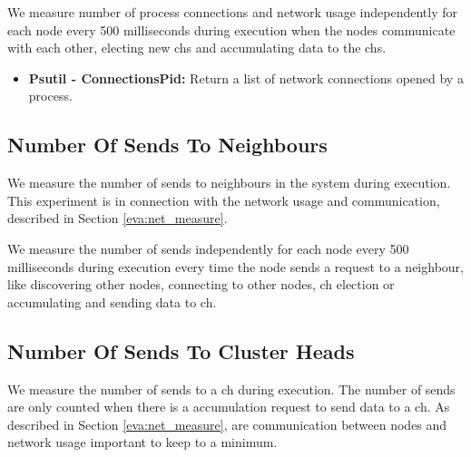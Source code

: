 \documentclass[USenglish]{uit-thesis}
\begin{document}

We measure number of process connections and network usage independently for each node every 500 milliseconds during execution when the nodes communicate with each other, electing new \glspl{ch} and accumulating data to the \glspl{ch}.

\begin{itemize}
\item \textbf{Psutil - ConnectionsPid:} Return a list of network connections opened by a process.
\end{itemize}



\subsection{Number Of Sends To Neighbours} \label{eva:num_sends}
We measure the number of sends to neighbours in the system during execution. This experiment is in connection with the network usage and communication, described in Section \ref{eva:net_measure}. 

We measure the number of sends independently for each node every 500 milliseconds during execution every time the node sends a request to a neighbour, like discovering other nodes, connecting to other nodes, \gls{ch} election or accumulating and sending data to \gls{ch}.


\subsection{Number Of Sends To Cluster Heads} \label{eva:num_sends_ch}
We measure the number of sends to a \gls{ch} during execution. The number of sends are only counted when there is a accumulation request to send data to a \gls{ch}. As described in Section \ref{eva:net_measure}, are communication between nodes and network usage important to keep to a minimum.
\end{document}
